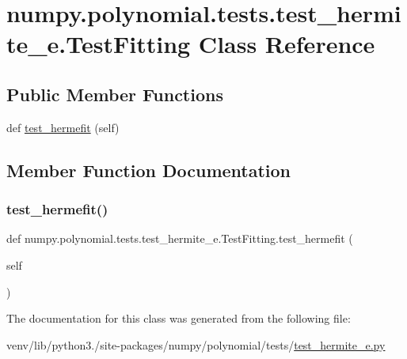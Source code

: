 \hypertarget{classnumpy_1_1polynomial_1_1tests_1_1test__hermite__e_1_1TestFitting}{}\section{numpy.\+polynomial.\+tests.\+test\+\_\+hermite\+\_\+e.\+Test\+Fitting Class Reference}
\label{classnumpy_1_1polynomial_1_1tests_1_1test__hermite__e_1_1TestFitting}
\subsection*{Public Member Functions}
\begin{DoxyCompactItemize}
\item 
def \hyperlink{classnumpy_1_1polynomial_1_1tests_1_1test__hermite__e_1_1TestFitting_a523353cdbfe315bfb6435ee77c1cc3a6}{test\+\_\+hermefit} (self)
\end{DoxyCompactItemize}


\subsection{Member Function Documentation}
\mbox{\label{classnumpy_1_1polynomial_1_1tests_1_1test__hermite__e_1_1TestFitting_a523353cdbfe315bfb6435ee77c1cc3a6}} 
\subsubsection{\texorpdfstring{test\+\_\+hermefit()}{test\_hermefit()}}
{\footnotesize\ttfamily def numpy.\+polynomial.\+tests.\+test\+\_\+hermite\+\_\+e.\+Test\+Fitting.\+test\+\_\+hermefit (\begin{DoxyParamCaption}\item[{}]{self }\end{DoxyParamCaption})}



The documentation for this class was generated from the following file\+:\begin{DoxyCompactItemize}
\item 
venv/lib/python3./site-\/packages/numpy/polynomial/tests/\hyperlink{test__hermite__e_8py}{test\+\_\+hermite\+\_\+e.\+py}\end{DoxyCompactItemize}
